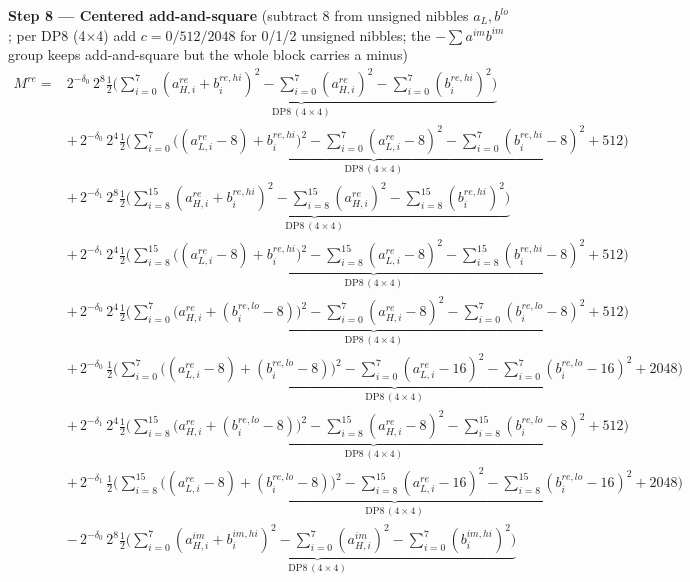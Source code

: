 \documentclass[fleqn]{article}
\newcommand{\DPop}[3]{\mathrm{DP#1}\,(#2\!\times\!#3)}
\begin{document}
\textbf{Step 8 --- Centered add-and-square}\quad
{\small(subtract $8$ from unsigned nibbles $a_L,b^{lo}$; per DP8 (4$\times$4) add $c=0/512/2048$ for 0/1/2 unsigned nibbles; the $-\sum a^{im}b^{im}$ group keeps add-and-square but the whole block carries a minus)}
\begin{align*}
M^{re} = {}
  & 2^{-\delta_0}\,2^{8}\underbrace{\tfrac12\Big(\sum_{i=0}^{7}(a_{H,i}^{re}{+}b_i^{re,hi})^2 - \sum_{i=0}^{7}(a_{H,i}^{re})^2 - \sum_{i=0}^{7}(b_i^{re,hi})^2\Big)}_{\DPop{8}{4}{4}} \\[0.6em]
  & +\, 2^{-\delta_0}\,2^{4}\underbrace{\tfrac12\Big(\sum_{i=0}^{7}\big((a_{L,i}^{re}{-}8){+}b_i^{re,hi}\big)^2 - \sum_{i=0}^{7}(a_{L,i}^{re}{-}8)^2 - \sum_{i=0}^{7}(b_i^{re,hi}{-}8)^2 + 512\Big)}_{\DPop{8}{4}{4}} \\[0.6em]
  & +\, 2^{-\delta_1}\,2^{8}\underbrace{\tfrac12\Big(\sum_{i=8}^{15}(a_{H,i}^{re}{+}b_i^{re,hi})^2 - \sum_{i=8}^{15}(a_{H,i}^{re})^2 - \sum_{i=8}^{15}(b_i^{re,hi})^2\Big)}_{\DPop{8}{4}{4}} \\[0.6em]
  & +\, 2^{-\delta_1}\,2^{4}\underbrace{\tfrac12\Big(\sum_{i=8}^{15}\big((a_{L,i}^{re}{-}8){+}b_i^{re,hi}\big)^2 - \sum_{i=8}^{15}(a_{L,i}^{re}{-}8)^2 - \sum_{i=8}^{15}(b_i^{re,hi}{-}8)^2 + 512\Big)}_{\DPop{8}{4}{4}} \\[0.6em]
  & +\, 2^{-\delta_0}\,2^{4}\underbrace{\tfrac12\Big(\sum_{i=0}^{7}\big(a_{H,i}^{re}{+}(b_i^{re,lo}{-}8)\big)^2 - \sum_{i=0}^{7}(a_{H,i}^{re}{-}8)^2 - \sum_{i=0}^{7}(b_i^{re,lo}{-}8)^2 + 512\Big)}_{\DPop{8}{4}{4}} \\[0.6em]
  & +\, 2^{-\delta_0}\,\underbrace{\tfrac12\Big(\sum_{i=0}^{7}\big((a_{L,i}^{re}{-}8){+}(b_i^{re,lo}{-}8)\big)^2 - \sum_{i=0}^{7}(a_{L,i}^{re}{-}16)^2 - \sum_{i=0}^{7}(b_i^{re,lo}{-}16)^2 + 2048\Big)}_{\DPop{8}{4}{4}} \\[0.6em]
  & +\, 2^{-\delta_1}\,2^{4}\underbrace{\tfrac12\Big(\sum_{i=8}^{15}\big(a_{H,i}^{re}{+}(b_i^{re,lo}{-}8)\big)^2 - \sum_{i=8}^{15}(a_{H,i}^{re}{-}8)^2 - \sum_{i=8}^{15}(b_i^{re,lo}{-}8)^2 + 512\Big)}_{\DPop{8}{4}{4}} \\[0.6em]
  & +\, 2^{-\delta_1}\,\underbrace{\tfrac12\Big(\sum_{i=8}^{15}\big((a_{L,i}^{re}{-}8){+}(b_i^{re,lo}{-}8)\big)^2 - \sum_{i=8}^{15}(a_{L,i}^{re}{-}16)^2 - \sum_{i=8}^{15}(b_i^{re,lo}{-}16)^2 + 2048\Big)}_{\DPop{8}{4}{4}} \\[0.6em]
  & -\, 2^{-\delta_0}\,2^{8}\underbrace{\tfrac12\Big(\sum_{i=0}^{7}(a_{H,i}^{im}{+}b_i^{im,hi})^2 - \sum_{i=0}^{7}(a_{H,i}^{im})^2 - \sum_{i=0}^{7}(b_i^{im,hi})^2\Big)}_{\DPop{8}{4}{4}} \\[0.6em]

\end{align*}
\end{document}
